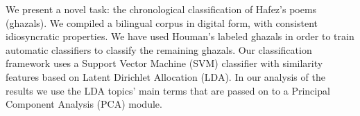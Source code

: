 We present a novel task: the chronological classification of Hafez's poems (ghazals). We compiled a bilingual corpus in digital form, with consistent idiosyncratic properties. We have used Houman's labeled ghazals in order to train automatic classifiers to classify the remaining ghazals. Our classification framework uses a Support Vector Machine (SVM) classifier with similarity features based on Latent Dirichlet Allocation (LDA). In our analysis of the results we use the LDA topics' main terms that are passed on to a Principal  Component Analysis (PCA) module.
